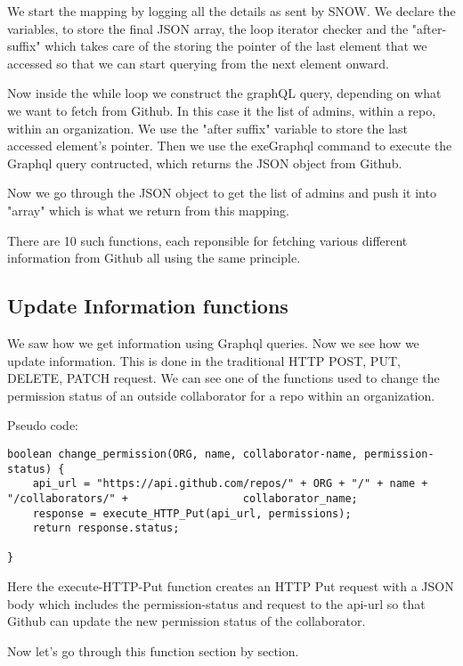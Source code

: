 We start the mapping by logging all the details as sent by SNOW. We declare the variables, to store the final JSON array, the loop iterator checker and the "after-suffix" which takes care of the storing the pointer of the last element that we accessed so that we can start querying from the next element onward.


Now inside the while loop we construct the graphQL query, depending on what we want to fetch from Github. In this case it the list of admins, within a repo, within an organization. We use the "after suffix" variable to store the last accessed element's pointer. Then we use the exeGraphql command to execute the Graphql query contructed, which returns the JSON object from Github.


Now we go through the JSON object to get the list of admins and push it into "array" which is what we return from this mapping.

There are 10 such functions, each reponsible for fetching various different information from Github all using the same principle.

\subsection{Update Information functions}
We saw how we get information using Graphql queries. Now we see how we update information. This is done in the traditional HTTP POST, PUT, DELETE, PATCH request. We can see one of the functions used to change the permission status of an outside collaborator for a repo within an organization.

Pseudo code:

\begin{lstlisting}[breaklines]
boolean change_permission(ORG, name, collaborator-name, permission-status) {
	api_url = "https://api.github.com/repos/" + ORG + "/" + name + "/collaborators/" + 					collaborator_name;
	response = execute_HTTP_Put(api_url, permissions);
	return response.status;
	
}
\end{lstlisting}

Here the execute-HTTP-Put function creates an HTTP Put request with a JSON body which includes the permission-status and request to the api-url so that Github can update the new permission status of the collaborator.

Now let's go through this function section by section.

